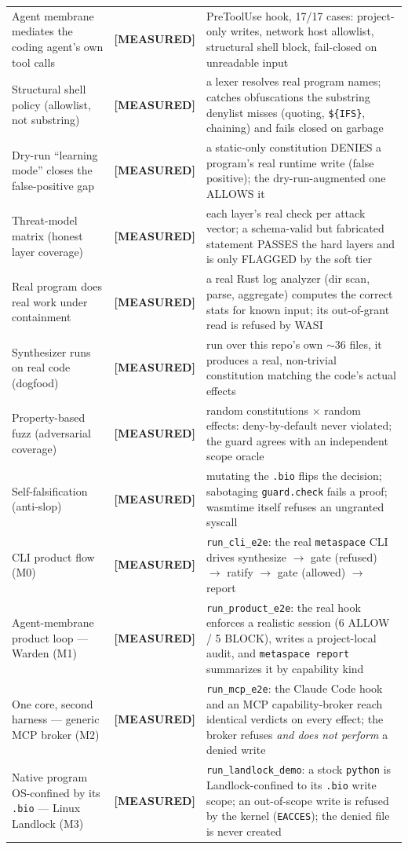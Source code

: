 \documentclass[10pt,a4paper]{article}
\newcommand{\code}[1]{\texttt{\footnotesize #1}}
\newcommand{\measured}{\textcolor{msblue}{\scriptsize\textbf{[MEASURED]}}}
\begin{document}
\begin{longtable}{@{}>{\raggedright\arraybackslash}p{8.9cm} p{1.5cm} >{\raggedright\arraybackslash}p{5.8cm}@{}}
Agent membrane mediates the coding agent's own tool calls & \measured &
PreToolUse hook, 17/17 cases: project-only writes, network host allowlist, structural shell block, fail-closed on unreadable input \\
Structural shell policy (allowlist, not substring) & \measured &
a lexer resolves real program names; catches obfuscations the substring denylist misses (quoting, \code{\$\{IFS\}}, chaining) and fails closed on garbage \\
Dry-run ``learning mode'' closes the false-positive gap & \measured &
a static-only constitution DENIES a program's real runtime write (false positive); the dry-run-augmented one ALLOWS it \\
Threat-model matrix (honest layer coverage) & \measured &
each layer's real check per attack vector; a schema-valid but fabricated statement PASSES the hard layers and is only FLAGGED by the soft tier \\
Real program does real work under containment & \measured &
a real Rust log analyzer (dir scan, parse, aggregate) computes the correct stats for known input; its out-of-grant read is refused by WASI \\
Synthesizer runs on real code (dogfood) & \measured &
run over this repo's own $\sim$36 files, it produces a real, non-trivial constitution matching the code's actual effects \\
Property-based fuzz (adversarial coverage) & \measured &
5000 random constitutions $\times$ random effects: deny-by-default never violated; the guard agrees with an independent scope oracle \\
Self-falsification (anti-slop) & \measured &
mutating the \code{.bio} flips the decision; sabotaging \code{guard.check} fails a proof; wasmtime itself refuses an ungranted syscall \\
CLI product flow (M0) & \measured &
\code{run\_cli\_e2e}: the real \code{metaspace} CLI drives synthesize $\to$ gate (refused) $\to$ ratify $\to$ gate (allowed) $\to$ report \\
Agent-membrane product loop --- Warden (M1) & \measured &
\code{run\_product\_e2e}: the real hook enforces a realistic session (6 ALLOW / 5 BLOCK), writes a project-local audit, and \code{metaspace report} summarizes it by capability kind \\
One core, second harness --- generic MCP broker (M2) & \measured &
\code{run\_mcp\_e2e}: the Claude Code hook and an MCP capability-broker reach identical verdicts on every effect; the broker refuses \emph{and does not perform} a denied write \\
Native program OS-confined by its \code{.bio} --- Linux Landlock (M3) & \measured &
\code{run\_landlock\_demo}: a stock \code{python} is Landlock-confined to its \code{.bio} write scope; an out-of-scope write is refused by the kernel (\code{EACCES}); the denied file is never created \\
\bottomrule
\end{longtable}
\end{document}
